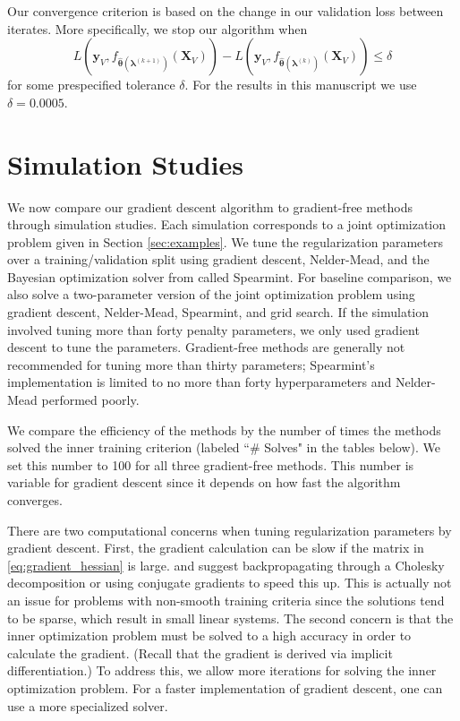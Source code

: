 \documentclass[12pt]{article}
\begin{document}
Our convergence criterion is based on the change in our validation loss between iterates. More specifically, we stop our algorithm when
\[
L \left( \boldsymbol{y}_V, f_{\hat{\boldsymbol \theta}(\boldsymbol{\lambda}^{(k+1)})}(\boldsymbol{X}_V)\right) -
L \left( \boldsymbol{y}_V, f_{\hat{\boldsymbol \theta}(\boldsymbol{\lambda}^{(k)})}(\boldsymbol{X}_V)\right) \leq \delta
\]
for some prespecified tolerance $\delta$. For the results in this manuscript we use $\delta = 0.0005$.

\section{Simulation Studies}\label{sec:results}

We now compare our gradient descent algorithm to gradient-free methods through simulation studies. Each simulation corresponds to a joint optimization problem given in Section \ref{sec:examples}. We tune the regularization parameters over a training/validation split using gradient descent, Nelder-Mead, and the Bayesian optimization solver from \citet{snoek2012practical} called Spearmint. For baseline comparison, we also solve a two-parameter version of the joint optimization problem using gradient descent, Nelder-Mead, Spearmint, and grid search. If the simulation involved tuning more than forty penalty parameters, we only used gradient descent to tune the parameters. Gradient-free methods are generally not recommended for tuning more than thirty parameters; Spearmint's implementation is limited to no more than forty hyperparameters and Nelder-Mead performed poorly.

We compare the efficiency of the methods by the number of times the methods solved the inner training criterion (labeled ``\# Solves" in the tables below). We set this number to 100 for all three gradient-free methods. This number is variable for gradient descent since it depends on how fast the algorithm converges.

There are two computational concerns when tuning regularization parameters by gradient descent. First, the gradient calculation can be slow if the matrix in \eqref{eq:gradient_hessian} is large. \citet{bengio2000gradient} and \citet{foo2008efficient} suggest backpropagating through a Cholesky decomposition or using conjugate gradients to speed this up. This is actually not an issue for problems with non-smooth training criteria since the solutions tend to be sparse, which result in small linear systems. The second concern is that the inner optimization problem must be solved to a high accuracy in order to calculate the gradient. (Recall that the gradient is derived via implicit differentiation.) To address this, we allow more iterations for solving the inner optimization problem. For a faster implementation of gradient descent, one can use a more specialized solver.
\end{document}
